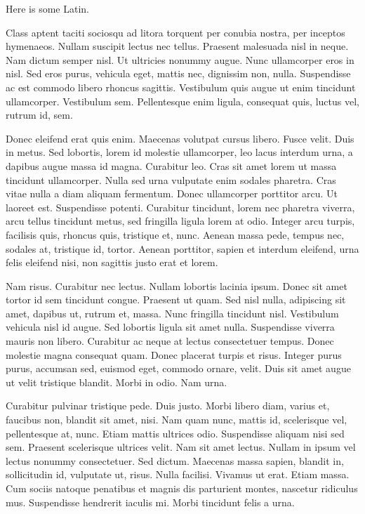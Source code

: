 \documentclass[a4paper,11pt]{report}
\begin{document}
Here is some Latin.

Class aptent taciti sociosqu ad litora torquent per conubia nostra, per inceptos hymenaeos. Nullam suscipit lectus nec tellus. Praesent malesuada nisl in neque. Nam dictum semper nisl. Ut ultricies nonummy augue. Nunc ullamcorper eros in nisl. Sed eros purus, vehicula eget, mattis nec, dignissim non, nulla. Suspendisse ac est commodo libero rhoncus sagittis. Vestibulum quis augue ut enim tincidunt ullamcorper. Vestibulum sem. Pellentesque enim ligula, consequat quis, luctus vel, rutrum id, sem.

Donec eleifend erat quis enim. Maecenas volutpat cursus libero. Fusce velit. Duis in metus. Sed lobortis, lorem id molestie ullamcorper, leo lacus interdum urna, a dapibus augue massa id magna. Curabitur leo. Cras sit amet lorem ut massa tincidunt ullamcorper. Nulla sed urna vulputate enim sodales pharetra. Cras vitae nulla a diam aliquam fermentum. Donec ullamcorper porttitor arcu. Ut laoreet est. Suspendisse potenti. Curabitur tincidunt, lorem nec pharetra viverra, arcu tellus tincidunt metus, sed fringilla ligula lorem at odio. Integer arcu turpis, facilisis quis, rhoncus quis, tristique et, nunc. Aenean massa pede, tempus nec, sodales at, tristique id, tortor. Aenean porttitor, sapien et interdum eleifend, urna felis eleifend nisi, non sagittis justo erat et lorem.

Nam risus. Curabitur nec lectus. Nullam lobortis lacinia ipsum. Donec sit amet tortor id sem tincidunt congue. Praesent ut quam. Sed nisl nulla, adipiscing sit amet, dapibus ut, rutrum et, massa. Nunc fringilla tincidunt nisl. Vestibulum vehicula nisl id augue. Sed lobortis ligula sit amet nulla. Suspendisse viverra mauris non libero. Curabitur ac neque at lectus consectetuer tempus. Donec molestie magna consequat quam. Donec placerat turpis et risus. Integer purus purus, accumsan sed, euismod eget, commodo ornare, velit. Duis sit amet augue ut velit tristique blandit. Morbi in odio. Nam urna.

Curabitur pulvinar tristique pede. Duis justo. Morbi libero diam, varius et, faucibus non, blandit sit amet, nisi. Nam quam nunc, mattis id, scelerisque vel, pellentesque at, nunc. Etiam mattis ultrices odio. Suspendisse aliquam nisi sed sem. Praesent scelerisque ultrices velit. Nam sit amet lectus. Nullam in ipsum vel lectus nonummy consectetuer. Sed dictum. Maecenas massa sapien, blandit in, sollicitudin id, vulputate ut, risus. Nulla facilisi. Vivamus ut erat. Etiam massa. Cum sociis natoque penatibus et magnis dis parturient montes, nascetur ridiculus mus. Suspendisse hendrerit iaculis mi. Morbi tincidunt felis a urna.
\end{document}
